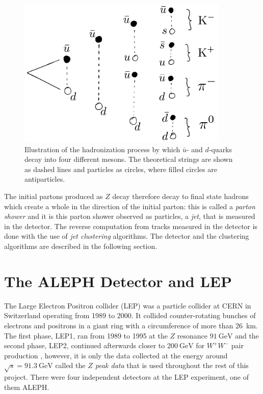 \begin{figure}
  \centerfloat
  \includegraphics[width=0.9\textwidth]{figures/hadronization/hadronization.pdf}
  \caption[Hadronization Process]{Illustration of the hadronization process by which $\bar{u}$- and $d$-quarks decay into four different mesons. The theoretical strings are shown as dashed lines and particles as circles, where filled circles are antiparticles.}
  \label{fig:hep:hadronization}
\end{figure}

The initial partons produced as $Z$ decay therefore decay to final state hadrons which create a whole  in the direction of the initial parton: this is called a \emph{parton shower} and it is this parton shower observed as particles, a \emph{jet}, that is measured in the detector. The reverse computation from tracks measured in the detector is done with the use of \emph{jet clustering} algorithms. The detector and the clustering algorithms are described in the following section.


\FloatBarrier
\section{The ALEPH Detector and LEP}
\label{sec:hep:aleph}

The Large Electron Positron collider (LEP) was a particle collider at CERN in Switzerland operating from \num{1989} to \num{2000}. It collided counter-rotating bunches of electrons and positrons in a giant ring with a circumference of more than \SI{26}{\km}. The first phase, LEP1, ran from \num{1989} to \num{1995} at the $Z$ resonance $\SI{91}{\GeV}$ and the second phase, LEP2, continued afterwards closer to $\SI{200}{\GeV}$ for $W^+W^-$ pair production \autocite{Armstrong1998hy}, however, it is only the data collected at the energy around $\sqrt{s} = \SI{91.3}{\GeV}$ called the \emph{$Z$ peak data} that is used throughout the rest of this project. There were four independent detectors at the LEP experiment, one of them ALEPH.

